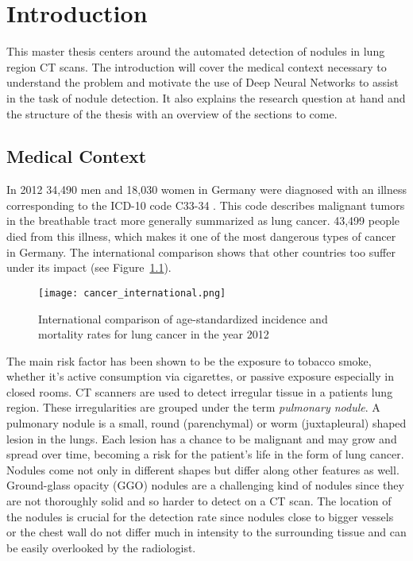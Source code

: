\documentclass[main.tex]{subfiles}
\begin{document}
\chapter{Introduction}
This master thesis centers around the automated detection of nodules in lung region CT scans. The introduction will cover the medical context necessary to understand the problem and motivate the use of Deep Neural Networks to assist in the task of nodule detection. It also explains the research question at hand and the structure of the thesis with an overview of the sections to come.

\section{Medical Context}
In 2012 34,490 men and 18,030 women in Germany were diagnosed with an illness corresponding to the ICD-10 code C33-34 \cite{koch2015krebs}. This code describes malignant tumors in the breathable tract more generally summarized as lung cancer. 43,499 people died from this illness, which makes it one of the most dangerous types of cancer in Germany. The international comparison shows that other countries too suffer under its impact (see Figure~\ref{fig:cancInt}).

\begin{figure}[ht]
\texttt{[image: cancer\_international.png]}
\caption{International comparison of age-standardized incidence and mortality rates for lung cancer in the year 2012}
\label{fig:cancInt}
\end{figure}

The main risk factor has been shown to be the exposure to tobacco smoke, whether it's active consumption via cigarettes, or passive exposure especially in closed rooms. CT scanners are used to detect irregular tissue in a patients lung region. These irregularities are grouped under the term \textit{pulmonary nodule}. A pulmonary nodule is a small, round (parenchymal) or worm (juxtapleural) shaped lesion in the lungs. Each lesion has a chance to be malignant and may grow and spread over time, becoming a risk for the patient's life in the form of lung cancer. Nodules come not only in different shapes but differ along other features as well. Ground-glass opacity (GGO) nodules are a challenging kind of nodules since they are not thoroughly solid and so harder to detect on a CT scan. The location of the nodules is crucial for the detection rate since nodules close to bigger vessels or the chest wall do not differ much in intensity to the surrounding tissue and can be easily overlooked by the radiologist.
\end{document}
